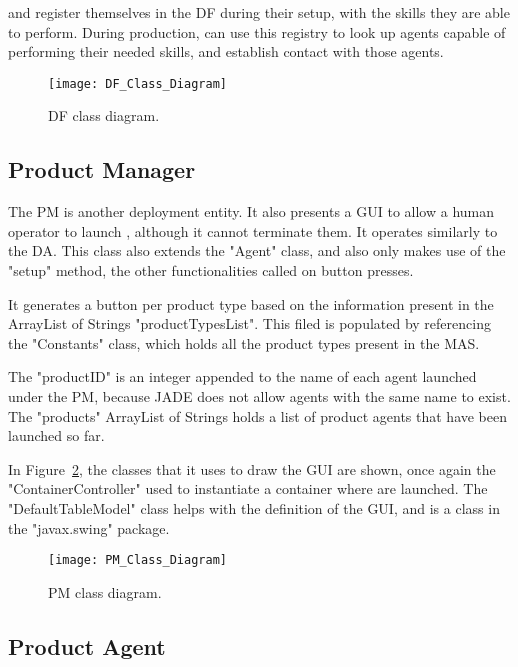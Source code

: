  and  register themselves in the \acrshort{DF} during their setup, with the skills they are able to perform. During production,  can use this registry to look up agents capable of performing their needed skills, and establish contact with those agents.

\begin{figure}[h!]
	\centering
	\texttt{[image: DF\_Class\_Diagram]}
	\caption{\acrlong{DF} class diagram.}
	\label{fig:df_class_diagram}
\end{figure}

\subsection{Product Manager}
\label{subsec:product_manager_agent}

The \acrfull{PM} is another deployment entity. It also presents a \acrshort{GUI} to allow a human operator to launch , although it cannot terminate them. It operates similarly to the \acrshort{DA}. This class also extends the "Agent" class, and also only makes use of the "setup" method, the other functionalities called on button presses.

It generates a button per product type based on the information present in the ArrayList of Strings "productTypesList". This filed is populated by referencing the "Constants" class, which holds all the product types present in the \acrshort{MAS}. 

The "productID" is an integer appended to the name of each agent launched under the \acrshort{PM}, because \acrshort{JADE} does not allow agents with the same name to exist. The "products" ArrayList of Strings holds a list of product agents that have been launched so far.

In Figure~\ref{fig:pm_class_diagram}, the classes that it uses to draw the \acrshort{GUI} are shown, once again the "ContainerController" used to instantiate a container where  are launched. The "DefaultTableModel" class helps with the definition of the \acrshort{GUI}, and is a class in the "javax.swing" package.\\

\begin{figure}[h!]
	\centering
	\texttt{[image: PM\_Class\_Diagram]}
	\caption{\acrlong{PM} class diagram.}
	\label{fig:pm_class_diagram}
\end{figure}

\subsection{Product Agent}
\label{subsec:product_agent}

